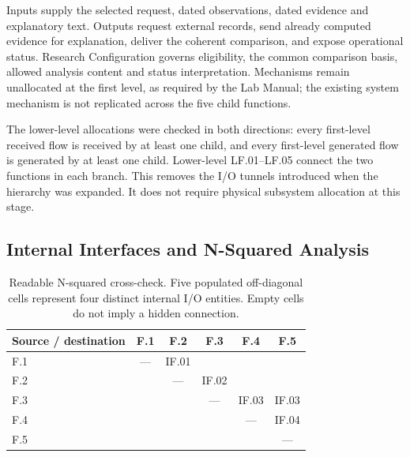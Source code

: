 \documentclass[11pt,letterpaper]{article}
\begin{document}
Inputs supply the selected request, dated observations, dated evidence and explanatory text. Outputs request external records, send already computed evidence for explanation, deliver the coherent comparison, and expose operational status. Research Configuration governs eligibility, the common comparison basis, allowed analysis content and status interpretation. Mechanisms remain unallocated at the first level, as required by the Lab Manual; the existing system mechanism is not replicated across the five child functions.

The lower-level allocations were checked in both directions: every first-level received flow is received by at least one child, and every first-level generated flow is generated by at least one child. Lower-level LF.01--LF.05 connect the two functions in each branch. This removes the I/O tunnels introduced when the hierarchy was expanded. It does not require physical subsystem allocation at this stage.

\subsection{Internal Interfaces and N-Squared Analysis}
\begin{table}[H]\centering\small
\begin{tabular}{@{}lccccc@{}}\toprule Source / destination & F.1 & F.2 & F.3 & F.4 & F.5\\\midrule
F.1 & --- & IF.01 & & & \\
F.2 & & --- & IF.02 & & \\
F.3 & & & --- & IF.03 & IF.03\\
F.4 & & & & --- & IF.04\\
F.5 & & & & & ---\\\bottomrule\end{tabular}
\caption{Readable N-squared cross-check. Five populated off-diagonal cells represent four distinct internal I/O entities. Empty cells do not imply a hidden connection.}\end{table}
\end{document}
